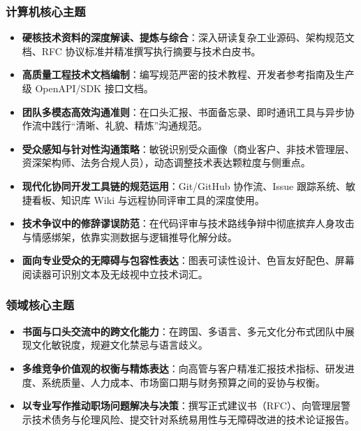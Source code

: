 \subsubsection{计算机核心主题}
\begin{itemize}
    \item \textbf{硬核技术资料的深度解读、提炼与综合}：深入研读复杂工业源码、架构规范文档、RFC 协议标准并精准撰写执行摘要与技术白皮书。
    \item \textbf{高质量工程技术文档编制}：编写规范严密的技术教程、开发者参考指南及生产级 OpenAPI/SDK 接口文档。
    \item \textbf{团队多模态高效沟通准则}：在口头汇报、书面备忘录、即时通讯工具与异步协作流中践行“清晰、礼貌、精炼”沟通规范。
    \item \textbf{受众感知与针对性沟通策略}：敏锐识别受众画像（商业客户、非技术管理层、资深架构师、法务合规人员），动态调整技术表达颗粒度与侧重点。
    \item \textbf{现代化协同开发工具链的规范运用}：Git/GitHub 协作流、Issue 跟踪系统、敏捷看板、知识库 Wiki 与远程协同评审工具的深度使用。
    \item \textbf{技术争议中的修辞谬误防范}：在代码评审与技术路线争辩中彻底摈弃人身攻击与情感绑架，依靠实测数据与逻辑推导化解分歧。
    \item \textbf{面向专业受众的无障碍与包容性表达}：图表可读性设计、色盲友好配色、屏幕阅读器可识别文本及无歧视中立技术词汇。
\end{itemize}

\subsubsection{领域核心主题}
\begin{itemize}
    \item \textbf{书面与口头交流中的跨文化能力}：在跨国、多语言、多元文化分布式团队中展现文化敏锐度，规避文化禁忌与语言歧义。
    \item \textbf{多维竞争价值观的权衡与精炼表达}：向高管与客户精准汇报技术指标、研发进度、系统质量、人力成本、市场窗口期与财务预算之间的妥协与权衡。
    \item \textbf{以专业写作推动职场问题解决与决策}：撰写正式建议书（RFC）、向管理层警示技术债务与伦理风险、提交针对系统易用性与无障碍改进的技术论证报告。
\end{itemize}

